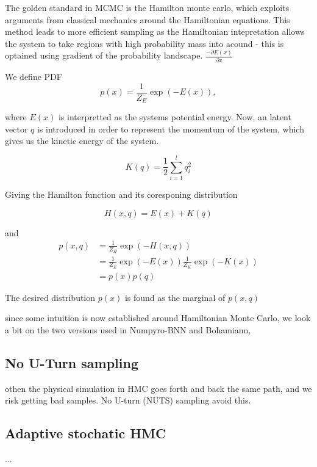 \begin{testexample}[HMC]
The golden standard in MCMC is the Hamilton monte carlo, which exploits arguments from classical mechanics
around the Hamiltonian equations. This method leads to more efficient sampling as the Hamiltonian intepretation allows the system
to take regions with high probability mass into acound - this is optained using gradient
of the probability landscape.  $\frac{-\partial E(x)}{\partial x} $
 
We define PDF
$$p(x) = \frac{1}{Z_E}\exp(-E(x)),$$

where $E(x)$ is interpretted as the systems potential energy. Now, an latent vector $q$ is introduced in order
to represent the momentum of the system, which gives us the kinetic energy of the system. 

$$K(q) = \frac{1}{2}\sum_{i=1}^l q_i^2$$

Giving the Hamilton function and its coresponing distribution

$$H(x,q)= E(x)+K(q)$$

and 
\begin{align}
    p(x,q) &= \frac{1}{Z_H} \exp(-H(x,q))\\
    &= \frac{1}{Z_E} \exp(-E(x))\frac{1}{Z_K} \exp(-K(x))\\
    &= p(x)p(q)
\end{align}

The desired distribution $p(x)$ is found as the marginal of $p(x,q)$

\end{testexample}

since some intuition is now established around Hamiltonian Monte Carlo, 
we look a bit on the two versions used in Numpyro-BNN and Bohamiann, 

\subsection{No U-Turn sampling}

othen the physical simulation in HMC goes forth and back the same path, and we risk getting bad samples.
No U-turn (NUTS) sampling avoid this. 

\subsection{Adaptive stochatic HMC}
... 



\newpage

